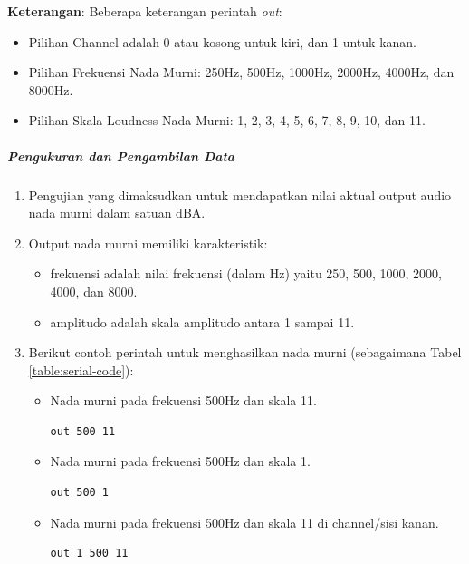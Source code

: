 \documentclass{article}
\begin{document}
	\textbf{Keterangan}: Beberapa keterangan perintah \textit{out}:
	\begin{itemize}
		\item Pilihan Channel adalah 0 atau kosong untuk kiri, dan 1 untuk kanan.
		\item Pilihan Frekuensi Nada Murni: 250Hz, 500Hz, 1000Hz, 2000Hz, 4000Hz, dan 8000Hz.
		\item Pilihan Skala Loudness Nada Murni: 1, 2, 3, 4, 5, 6, 7, 8, 9, 10, dan 11.
	\end{itemize}

	\subparagraph{Pengukuran dan Pengambilan Data}

		\begin{enumerate}
			\item Pengujian yang dimaksudkan untuk mendapatkan nilai aktual output audio nada murni dalam satuan dBA.

			\item Output nada murni memiliki karakteristik:
			\begin{itemize}
				\item frekuensi adalah nilai frekuensi (dalam Hz) yaitu 250, 500, 1000, 2000, 4000, dan 8000.
				\item amplitudo adalah skala amplitudo antara 1 sampai 11.
			\end{itemize}

			\item Berikut contoh perintah untuk menghasilkan nada murni (sebagaimana Tabel \ref{table:serial-code}):

			\begin{itemize}
				\item Nada murni pada frekuensi 500Hz dan skala 11.
				\begin{verbatim}
out 500 11
				\end{verbatim}

				\item Nada murni pada frekuensi 500Hz dan skala 1.
				\begin{verbatim}
out 500 1
				\end{verbatim}

				\item Nada murni pada frekuensi 500Hz dan skala 11 di channel/sisi kanan.
				\begin{verbatim}
out 1 500 11
				\end{verbatim}


\end{itemize}
\end{enumerate}
\end{document}
